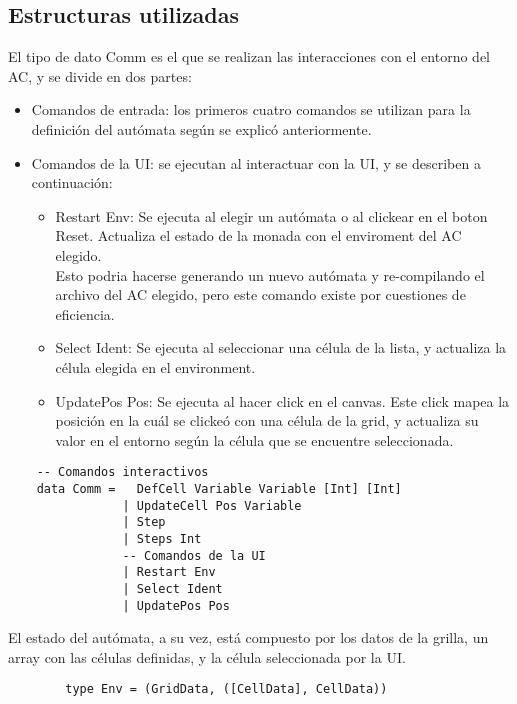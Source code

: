 \documentclass[fleqn,a4paper,11pt]{article}
\theoremstyle{mytheor}
\begin{document}
    \subsection{Estructuras utilizadas}
    El tipo de dato Comm es el que se realizan las interacciones con el entorno del AC, y se divide en dos partes:
    \begin{itemize}
        \item Comandos de entrada: los primeros cuatro comandos se utilizan para la definición del autómata según se explicó anteriormente.
        \item Comandos de la UI: se ejecutan al interactuar con la UI, y se describen a continuación:
            \begin{itemize}
                \item Restart Env: Se ejecuta al elegir un autómata o al clickear en el boton Reset. Actualiza el estado de la monada con el enviroment del AC elegido.\\
                Esto podria hacerse generando un nuevo autómata y re-compilando el archivo del AC elegido, pero este comando existe por cuestiones de eficiencia.
                \item Select Ident: Se ejecuta al seleccionar una célula de la lista, y actualiza la célula elegida en el environment.
                \item UpdatePos Pos: Se ejecuta al hacer click en el canvas. Este click mapea la posición en la cuál se clickeó con una célula de la grid, y actualiza su valor en el entorno según la célula que se encuentre seleccionada.
            \end{itemize}
    \end{itemize}
        
    \begin{verbatim}
    -- Comandos interactivos
    data Comm =   DefCell Variable Variable [Int] [Int]
                | UpdateCell Pos Variable
                | Step 
                | Steps Int
                -- Comandos de la UI
                | Restart Env
                | Select Ident
                | UpdatePos Pos
    \end{verbatim}

    El estado del autómata, a su vez, está compuesto por los datos de la grilla, un array con las células definidas, y la célula seleccionada por la UI.
    \begin{verbatim}
        type Env = (GridData, ([CellData], CellData))
    \end{verbatim}
\end{document}
